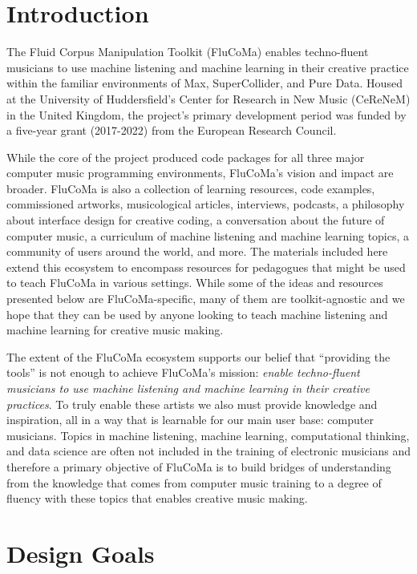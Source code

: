 \documentclass{article}
\begin{document}
\tableofcontents

\section{Introduction}\label{introduction}

The Fluid Corpus Manipulation Toolkit (FluCoMa) enables techno-fluent
musicians to use machine listening and machine learning in their
creative practice within the familiar environments of Max,
SuperCollider, and Pure Data. Housed at the University of Huddersfield's
Center for Research in New Music (CeReNeM) in the United Kingdom, the
project's primary development period was funded by a five-year grant
(2017-2022) from the European Research Council.

While the core of the project produced code packages for all three major
computer music programming environments, FluCoMa's vision and impact are
broader. FluCoMa is also a collection of learning resources, code
examples, commissioned artworks, musicological articles, interviews,
podcasts, a philosophy about interface design for creative coding, a
conversation about the future of computer music, a curriculum of machine
listening and machine learning topics, a community of users around the
world, and more. The materials included here extend this ecosystem to
encompass resources for pedagogues that might be used to teach FluCoMa
in various settings. While some of the ideas and resources presented
below are FluCoMa-specific, many of them are toolkit-agnostic and we
hope that they can be used by anyone looking to teach machine listening
and machine learning for creative music making.

The extent of the FluCoMa ecosystem supports our belief that ``providing
the tools'' is not enough to achieve FluCoMa's mission: \emph{enable
techno-fluent musicians to use machine listening and machine learning in
their creative practices}. To truly enable these artists we also must
provide knowledge and inspiration, all in a way that is learnable for
our main user base: computer musicians. Topics in machine listening,
machine learning, computational thinking, and data science are often not
included in the training of electronic musicians and therefore a primary
objective of FluCoMa is to build bridges of understanding from the
knowledge that comes from computer music training to a degree of fluency
with these topics that enables creative music making.

\section{Design Goals}
\end{document}
